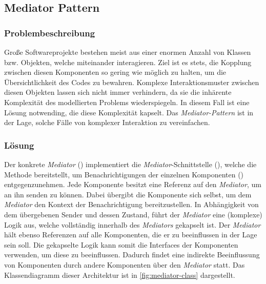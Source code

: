 \subsection{Mediator Pattern}


\subsubsection*{Problembeschreibung}

Große Softwareprojekte bestehen meist aus einer enormen Anzahl von Klassen bzw. Objekten, welche miteinander interagieren. Ziel ist es stets, die Kopplung zwischen diesen Komponenten so gering wie möglich zu halten, um die Übersichtlichkeit des Codes zu bewahren. Komplexe Interaktionsmuster zwischen diesen Objekten lassen sich nicht immer verhindern, da sie die inhärente Komplexität des modellierten Problems wiederspiegeln. In diesem Fall ist eine Lösung notwending, die diese Komplexität kapselt. Das \emph{Mediator-Pattern} ist in der Lage, solche Fälle von komplexer Interaktion zu vereinfachen. \cite{gamma_design_1995}

\subsubsection*{Lösung}

Der konkrete \emph{Mediator} () implementiert die \emph{Mediator}-Schnittstelle (), welche die Methode  bereitstellt, um Benachrichtigungen der einzelnen Komponenten () entgegenzunehmen. Jede Komponente besitzt eine Referenz auf den \emph{Mediator}, um  an ihn senden zu können. Dabei übergibt die Komponente sich selbst, um dem \emph{Mediator} den Kontext der Benachrichtigung bereitzustellen. In Abhängigkeit von dem übergebenen Sender und dessen Zustand, führt der \emph{Mediator} eine (komplexe) Logik aus, welche vollständig innerhalb des \emph{Mediators} gekapselt ist. Der \emph{Mediator} hält ebenso Referenzen auf alle Komponenten, die er zu beeinflussen in der Lage sein soll. Die gekapselte Logik kann somit die Interfaces der Komponenten verwenden, um diese zu beeinflussen. Dadurch findet eine indirekte Beeinflussung von Komponenten durch andere Komponenten über den \emph{Mediator} statt. Das Klassendiagramm dieser Architektur ist in \autoref{fig:mediator-class} dargestellt.

